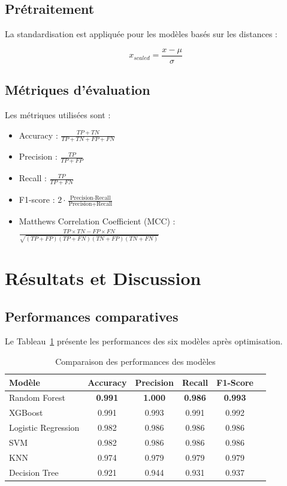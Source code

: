 \documentclass[conference]{IEEEtran}
\begin{document}
\subsection{Prétraitement}

La standardisation est appliquée pour les modèles basés sur les distances :

\begin{equation}
x_{scaled} = \frac{x - \mu}{\sigma}
\end{equation}

\subsection{Métriques d'évaluation}

Les métriques utilisées sont :
\begin{itemize}
\item Accuracy : $\frac{TP+TN}{TP+TN+FP+FN}$
\item Precision : $\frac{TP}{TP+FP}$
\item Recall : $\frac{TP}{TP+FN}$
\item F1-score : $2 \cdot \frac{\text{Precision} \cdot \text{Recall}}{\text{Precision} + \text{Recall}}$
\item Matthews Correlation Coefficient (MCC) : $\frac{TP \times TN - FP \times FN}{\sqrt{(TP+FP)(TP+FN)(TN+FP)(TN+FN)}}$
\end{itemize}

\section{Résultats et Discussion}

\subsection{Performances comparatives}

Le Tableau~\ref{tab:results} présente les performances des six modèles après optimisation.

\begin{table}[H]
\centering
\caption{Comparaison des performances des modèles}
\label{tab:results}
\begin{tabular}{lccccc}
\toprule
Modèle & Accuracy & Precision & Recall & F1-Score \\
\midrule
Random Forest & \textbf{0.991} & \textbf{1.000} & \textbf{0.986} & \textbf{0.993} \\
XGBoost & 0.991 & 0.993 & 0.991 & 0.992 \\
Logistic Regression & 0.982 & 0.986 & 0.986 & 0.986 \\
SVM & 0.982 & 0.986 & 0.986 & 0.986 \\
KNN & 0.974 & 0.979 & 0.979 & 0.979 \\
Decision Tree & 0.921 & 0.944 & 0.931 & 0.937 \\
\bottomrule
\end{tabular}
\end{table}
\end{document}
